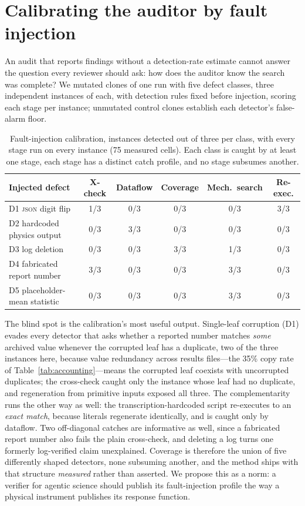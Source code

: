 \documentclass{article}
\begin{document}
\section{Calibrating the auditor by fault injection}
\label{sec:calibration}

An audit that reports findings without a detection-rate estimate cannot answer the question every reviewer should ask: how does the auditor know the search was complete? We mutated clones of one run with five defect classes, three independent instances of each, with detection rules fixed before injection, scoring each stage per instance; unmutated control clones establish each detector's false-alarm floor.

\begin{table}[t]
\centering
\caption{Fault-injection calibration, instances detected out of three per class, with every stage run on every instance (75 measured cells). Each class is caught by at least one stage, each stage has a distinct catch profile, and no stage subsumes another.}
\label{tab:calibration}
\begin{tabular}{lccccc}
\toprule
Injected defect & X-check & Dataflow & Coverage & Mech.\ search & Re-exec. \\
\midrule
D1 \textsc{json} digit flip     & 1/3 & 0/3 & 0/3 & 0/3 & 3/3 \\
D2 hardcoded physics output     & 0/3 & 3/3 & 0/3 & 0/3 & 0/3 \\
D3 log deletion                 & 0/3 & 0/3 & 3/3 & 1/3 & 0/3 \\
D4 fabricated report number     & 3/3 & 0/3 & 0/3 & 3/3 & 0/3 \\
D5 placeholder-mean statistic   & 0/3 & 0/3 & 0/3 & 3/3 & 0/3 \\
\bottomrule
\end{tabular}
\end{table}

The blind spot is the calibration's most useful output. Single-leaf corruption (D1) evades every detector that asks whether a reported number matches \emph{some} archived value whenever the corrupted leaf has a duplicate, two of the three instances here, because value redundancy across results files---the 35\% copy rate of Table~\ref{tab:accounting}---means the corrupted leaf coexists with uncorrupted duplicates; the cross-check caught only the instance whose leaf had no duplicate, and regeneration from primitive inputs exposed all three. The complementarity runs the other way as well: the transcription-hardcoded script re-executes to an \emph{exact match}, because literals regenerate identically, and is caught only by dataflow. Two off-diagonal catches are informative as well, since a fabricated report number also fails the plain cross-check, and deleting a log turns one formerly log-verified claim unexplained. Coverage is therefore the union of five differently shaped detectors, none subsuming another, and the method ships with that structure \emph{measured} rather than asserted. We propose this as a norm: a verifier for agentic science should publish its fault-injection profile the way a physical instrument publishes its response function.
\end{document}
